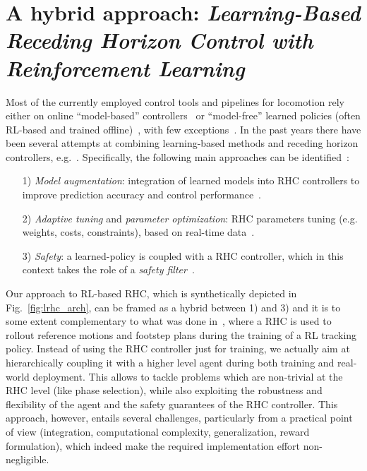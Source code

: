\section{A hybrid approach: \textnormal{\textit{Learning-Based Receding Horizon Control with Reinforcement Learning}}}
Most of the currently employed control tools and pipelines for locomotion rely either on online ``model-based'' controllers~\cite{modern_mpc:grandia2023perceptive,web::atlas_grip_boston_dyn} or ``model-free'' learned policies (often RL-based and trained offline)~\cite{mpc_learn:aswani2012provably, mpc_learn:terzi2018learning, mpc_learn:soloperto2018learning, rl:schneider2023learning, rl:miki2024learning,mpc_learn:berkenkamp2016safe,mpc_learn:marco2016automatic,mpc_learn:brunner2015stabilizing,mpc_learn:rosolia2019learning,mpc_learn:englert2017inverse,mpc_learn:koller2018learning,mpc_learn:wabersich2021probabilistic,mpc_learn:gillulay2011guaranteed,mpc_learn:wabersich2018safe,mpc_learn:berkenkamp2017safe}, with few exceptions~\cite{hybrid_rl_to:Jenelten_2024}.
In the past years there have been several attempts at combining learning-based methods and receding horizon controllers, e.g.~\cite{mpc_learn:tsounis2020deepgait,mpc_learn:gangapurwala2021real}. Specifically, the following main approaches can be identified~\cite{mpc_learn:hewing2020learning}:
\begin{itemize}
	\item[1)] \textit{Model augmentation}: integration of learned models into RHC controllers to improve prediction accuracy and control performance~\cite{mpc_learn:aswani2012provably,mpc_learn:terzi2018learning,mpc_learn:soloperto2018learning}.
	\item[2)] \textit{Adaptive tuning} and \textit{parameter optimization}: RHC parameters tuning (e.g. weights, costs, constraints), based on real-time data~\cite{mpc_learn:berkenkamp2016safe,mpc_learn:marco2016automatic,mpc_learn:brunner2015stabilizing,mpc_learn:englert2017inverse,mpc_learn:rosolia2019learning,mpc_learn:romero2023actor}.
	\item[3)] \textit{Safety}: a learned-policy is coupled with a RHC controller, which in this context takes the role of a \textit{safety filter}~\cite{mpc_learn:koller2018learning,mpc_learn:wabersich2021probabilistic,mpc_learn:gillulay2011guaranteed,mpc_learn:wabersich2018safe,mpc_learn:berkenkamp2017safe}.
\end{itemize}
Our approach to RL-based RHC, which is synthetically depicted in Fig.~\ref{fig:lrhc_arch}, can be framed as a hybrid between 1) and 3) and it is to some extent complementary to what was done in~\cite{mpc_learn:hewing2020learning}, where a RHC is used to rollout reference motions and footstep plans during the training of a RL tracking policy. Instead of using the RHC controller just for training, we actually aim at hierarchically coupling it with a higher level agent during both training and real-world deployment. This allows to tackle problems which are non-trivial at the RHC level (like phase selection), while also exploiting the robustness and flexibility of the agent and the safety guarantees of the RHC controller. 
This approach, however, entails several challenges, particularly from a practical point of view (integration, computational complexity, generalization, reward formulation), which indeed make the required implementation effort non-negligible. 